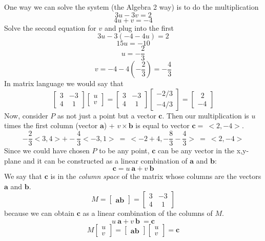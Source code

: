 \documentclass[11pt, oneside]{article}
\begin{document}
One way we can solve the system (the Algebra 2 way) is to do the multiplication
\[ 3u - 3v = 2 \]
\[ 4u + v = -4 \]
Solve the second equation for $v$ and plug into the first
\[ 3u -3(-4 - 4u) = 2 \]
\[ 15u = -10 \]
\[ u = -\frac{2}{3} \]
\[ v = -4 -4(-\frac{2}{3}) = -\frac{4}{3} \]
In matrix language we would say that
\[ \begin{bmatrix}
3 & -3 \\
4 & \ \ 1 
\end{bmatrix}
\begin{bmatrix}
u \\
v
\end{bmatrix}
=
\begin{bmatrix}
3 & -3 \\
4 & \ \ 1 
\end{bmatrix}
\begin{bmatrix}
-2/3 \\
-4/3
\end{bmatrix}
=
\begin{bmatrix}
\ \ 2 \\
-4 
\end{bmatrix}
\]
Now, consider $P$ as not just a point but a vector $\mathbf{c}$.  Then our multiplication is $u$ times the first column (vector $\mathbf{a}$) + $v \times \mathbf{b}$ is equal to vector $\mathbf{c} = \ <2,-4>$.
\[ -\frac{2}{3} 
<3,4>
+
-\frac{4}{3} 
<-3,1> \ = \
<-2+4,-\frac{8}{3} -  \frac{4}{3}> \ = \
<2,-4>
\]
Since we could have chosen $P$ to be any point, $\mathbf{c}$ can be any vector in the x,y-plane and it can be constructed as a linear combination of $\mathbf{a}$ and $\mathbf{b}$:
\[ \mathbf{c} = u \ \mathbf{a} +  v \ \mathbf{b} \]
We say that $\mathbf{c}$ is in the \emph{column space} of the matrix whose columns are the vectors $\mathbf{a}$ and $\mathbf{b}$.
\[ M = 
\begin{bmatrix}
\mathbf{a} \mathbf{b}
\end{bmatrix}
=
\begin{bmatrix}
3 & -3 \\
4 & \ \ 1 
\end{bmatrix}
\]
because we can obtain $\mathbf{c}$ as a linear combination of the columns of $M$.  
\[ u\ \mathbf{a} +  v \ \mathbf{b}\ = \mathbf{c} \]
\[ M 
\begin{bmatrix}
u \\
v
\end{bmatrix}
=
\begin{bmatrix}
\mathbf{a} \mathbf{b}
\end{bmatrix}
\begin{bmatrix}
u \\
v
\end{bmatrix}
=
\mathbf{c} \]
\end{document}
